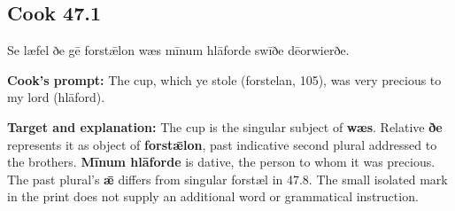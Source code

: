 \par\begin{minipage}{\linewidth}\raggedright
\subsection*{Cook 47.1}

Se læfel ðe gē forstǣlon wæs mīnum hlāforde swīðe dēorwierðe.

\textbf{Cook’s prompt:} The cup, which ye stole (forstelan, 105), was very precious to my lord (hlāford).

\textbf{Target and explanation:} The cup is the singular subject of \textbf{wæs}. Relative \textbf{ðe} represents it as object of \textbf{forstǣlon}, past indicative second plural addressed to the brothers. \textbf{Mīnum hlāforde} is dative, the person to whom it was precious. The past plural’s \textbf{ǣ} differs from singular forstæl in 47.8. The small isolated mark in the print does not supply an additional word or grammatical instruction.

\end{minipage}\par\addvspace{4pt}

